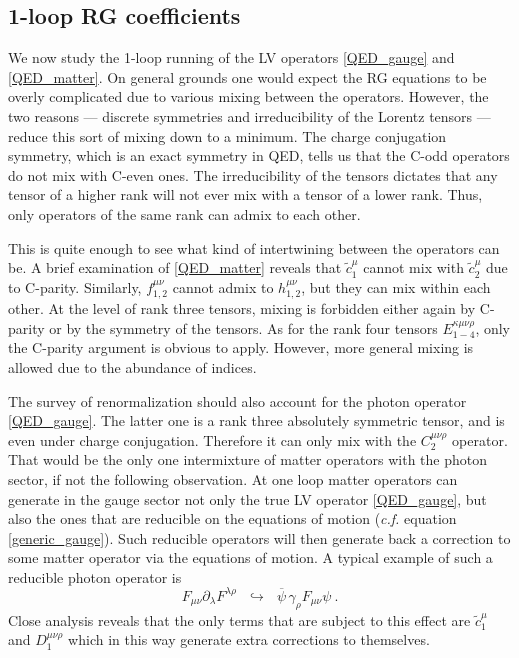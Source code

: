 \documentclass[12pt]{revtex4}
\newcommand{\wt}{\widetilde}
\newcommand{\ov}{\overline}
\begin{document}
\subsection{1-loop RG coefficients}
	We now study the 1-loop running of the LV operators 
	\eqref{QED_gauge} and \eqref{QED_matter}.
	On general grounds one would expect the RG equations to be overly
	complicated due to various mixing between the operators.
	However, the two reasons --- discrete symmetries and irreducibility
	of the Lorentz tensors --- reduce this sort of mixing down to
	a minimum.
	The charge conjugation symmetry, which is an exact symmetry in QED,
	tells us that the C-odd operators do not mix with C-even ones.
	The irreducibility of the tensors dictates that any tensor of
	a higher rank will not ever mix with a tensor of a lower rank.
	Thus, only operators of the same rank can admix to each other.
	
	This is quite enough to see what kind of intertwining between 
	the operators can be.
	A brief examination of \eqref{QED_matter} reveals that
	$ \wt{c}_1^\mu $ cannot mix with $ \wt{c}_2^\mu $ due to C-parity.
	Similarly, $ f_{1,2}^{\mu\nu} $ cannot admix to $ h_{1,2}^{\mu\nu} $,
	but they can mix within each other.
	At the level of rank three tensors, mixing is forbidden either
	again by C-parity or by the symmetry of the tensors. 
	As for the rank four tensors $ E_{1-4}^{\kappa\mu\nu\rho} $,
	only the C-parity argument is obvious to apply.
	However, more general mixing is allowed due to the abundance
	of indices.
		
	The survey of renormalization should also account for the photon
	operator \eqref{QED_gauge}.
	The latter one is a rank three absolutely symmetric tensor, 
	and is even under charge conjugation.  
	Therefore it can only mix with the $ C_2^{\mu\nu\rho} $ operator.
	That would be the only one intermixture of matter operators with
	the photon sector, if not the following observation.
	At one loop matter operators can generate in the gauge sector not 
	only the true LV operator \eqref{QED_gauge}, 
	but also the ones that are reducible on the equations of motion
	({\it c.f.} equation \eqref{generic_gauge}).
	Such reducible operators will then generate back a correction to 
	some matter operator via the equations of motion.
	A typical example of such a reducible photon operator is 
\[
 	F_{\mu\nu} \partial_\lambda F^{\lambda\rho} 
	~~~\hookrightarrow~~~
		\ov{\psi}\, \gamma_\rho F_{\mu\nu} \psi
	~.
\]
	Close analysis reveals that the only terms that are subject
	to this effect are $ \wt{c}_1^\mu $ and $ D_1^{\mu\nu\rho} $
	which in this way generate extra corrections to themselves.
\end{document}
